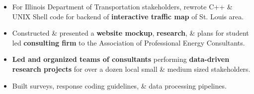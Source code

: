 \documentclass[8pt,a4paper,ragged2e,withhyper]{altacv}
\begin{document}
\begin{paracol}{2}

\smallskip

\begin{itemize}
\item For Illinois Department of Transportation stakeholders, rewrote C++ \& UNIX Shell code  for backend of \textbf{interactive traffic map} of St. Louis area.

\end{itemize}

\divider

\begin{itemize}
\item Constructed \& presented a \textbf{website mockup}, \textbf{research}, \& plans for student led \textbf{consulting firm} to the Association of Professional Energy Consultants.%
\end{itemize}

\divider





\begin{itemize}
\item \textbf{Led and organized teams of consultants} performing \textbf{data-driven research projects} for over a dozen local small \& medium sized stakeholders.
\item Built surveys, response coding guidelines, \& data processing pipelines.
\end{itemize}


\end{paracol}
\end{document}
